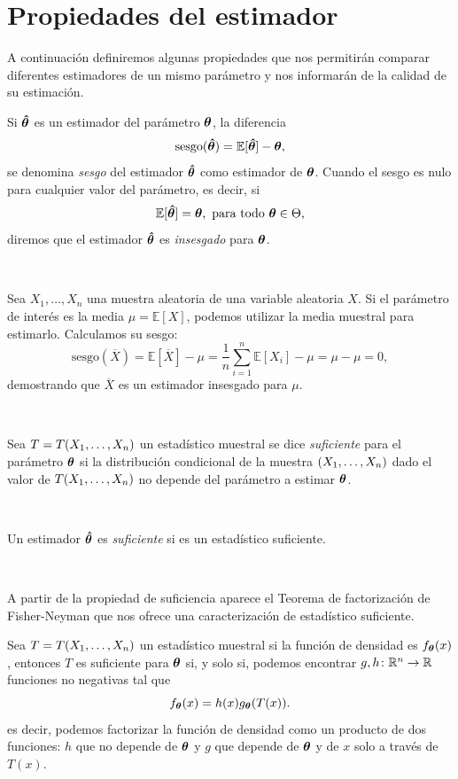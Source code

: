 \documentclass[oneside,openright,titlepage,numbers=noenddot,openany,headinclude,footinclude=true,
cleardoublepage=empty,abstractoff,BCOR=5mm,paper=a4,fontsize=12pt,main=spanish]{scrreprt}
\begin{document}
\section{Propiedades del estimador}

A continuación definiremos algunas propiedades que nos permitirán comparar diferentes estimadores de un mismo parámetro y nos informarán de la calidad de su estimación.\\

\begin{definition}
Si $\bm{\hat{\theta}}$ es un estimador del parámetro $\bm{\theta}$, la diferencia $$\text{sesgo}(\bm{\hat{\theta}})=\mathbb{E}[\bm{\hat{\theta}}]-\bm{\theta},$$
se denomina \textit{sesgo} del estimador $\bm{\hat{\theta}}$ como estimador de $\bm{\theta}$. Cuando el sesgo es nulo para cualquier valor del parámetro, es decir, si $$\mathbb{E}[\htheta]=\btheta, \ \text{para todo} \ \btheta \in \Theta,$$
diremos que el estimador $\bm{\hat{\theta}}$ es \textit{insesgado} para $\bm{\theta}$.
\end{definition}\

\begin{example} \label{ex:sesgonul}
Sea $X_1,\dots,X_n$ una muestra aleatoria de una variable aleatoria $X$. Si el parámetro de interés es la media $\mu=\mathbb{E}[X]$, podemos utilizar la media muestral para estimarlo. Calculamos su sesgo: $$\text{sesgo}(\overline{X})=\mathbb{E}[\overline{X}]-\mu=\frac{1}{n}\sum_{i=1}^n \mathbb{E}[X_i]-\mu=\mu-\mu=0,$$
demostrando que $\overline{X}$ es un estimador insesgado para $\mu$.
\end{example}\

\begin{definition}
Sea $T=T(X_1,\dots,X_n)$ un estadístico muestral se dice \textit{suficiente} para el parámetro $\bm{\theta}$ si la distribución condicional de la muestra $(X_1,\dots,X_n)$ dado el valor de $T(X_1,\dots,X_n)$ no depende del parámetro a estimar $\bm{\theta}$.
\end{definition}\


\begin{definition}
Un estimador $\bm{\hat{\theta}}$ es \textit{suficiente} si es un estadístico suficiente.
\end{definition}\

A partir de la propiedad de suficiencia aparece el Teorema de factorización de Fisher-Neyman que nos ofrece una caracterización de estadístico suficiente.\\


\begin{theorem}
Sea $T=T(X_1,\dots,X_n)$ un estadístico muestral si la función de densidad es $f_{\bm{\theta}}(x)$, entonces $T$ es suficiente para $\bm{\theta}$ si, y solo si, podemos encontrar $g,h\colon \mathbb{R}^n \to \mathbb{R}$ funciones no negativas tal que $$f_{\bm{\theta}}(x)=h(x)g_{\bm{\theta}}(T(x)).$$
es decir, podemos factorizar la función de densidad como un producto de dos funciones: $h$ que no depende de $\bm{\theta}$ y $g$ que depende de $\bm{\theta}$ y de $x$ solo a través de $T(x)$.
\end{theorem}\
\end{document}
